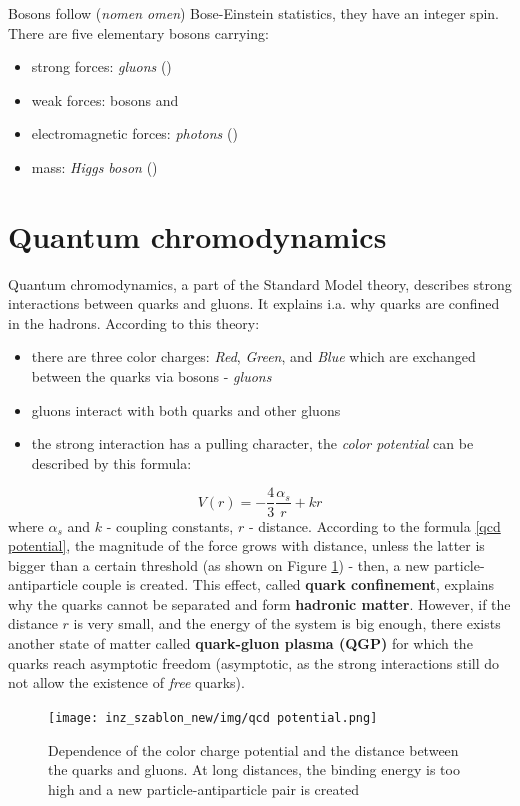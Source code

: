    
Bosons follow (\emph{nomen omen}) Bose-Einstein statistics, they have an integer spin. There are five elementary bosons carrying: 
\begin{itemize}
    \item strong forces: \emph{gluons} (\Pg)
    \item weak forces: bosons \PWpm and \PZz
    \item electromagnetic forces: \emph{photons} (\Pgg)
    \item mass: \emph{Higgs boson} (\PH) 
\end{itemize}

\section{Quantum chromodynamics}
Quantum chromodynamics, a part of the Standard Model theory, describes strong interactions between quarks and gluons. It explains i.a. why quarks are confined in the hadrons\cite{zbroszczyk}. According to this theory:
\begin{itemize}
    \item there are three color charges: \emph{Red}, \emph{Green}, and \emph{Blue} which are exchanged between the quarks via bosons - \emph{gluons}
    \item gluons interact with both quarks and other gluons
    \item the strong interaction has a pulling character, the \emph{color potential} can be described by this formula:
\end{itemize}
\begin{equation} \label{qcd potential}
    V (r) = - \frac{4}{3} \frac{\alpha_s}{r} + kr 
\end{equation}
where $\alpha_s$ and $k$ - coupling constants, $r$ - distance.
According to the formula \ref{qcd potential}, the magnitude of the force grows with distance, unless the latter is bigger than a certain threshold (as shown on Figure \ref{qcd graph}) - then, a new particle-antiparticle couple is created. This effect, called \textbf{quark confinement}, explains why the quarks cannot be separated and form \textbf{hadronic matter}. However, if the distance $r$ is very small, and the energy of the system is big enough, there exists another state of matter called \textbf{quark-gluon plasma (QGP)} for which the quarks reach asymptotic freedom (asymptotic, as the strong interactions still do not allow the existence of \emph{free} quarks).
\begin{figure}[H]
    \centering
    \texttt{[image: inz\_szablon\_new/img/qcd potential.png]}
    \caption{Dependence of the color charge potential and the distance between the quarks and gluons. At long distances, the binding energy is too high and a new particle-antiparticle pair is created \cite{grebieszkow}}
    \label{qcd graph}
 \end{figure}
